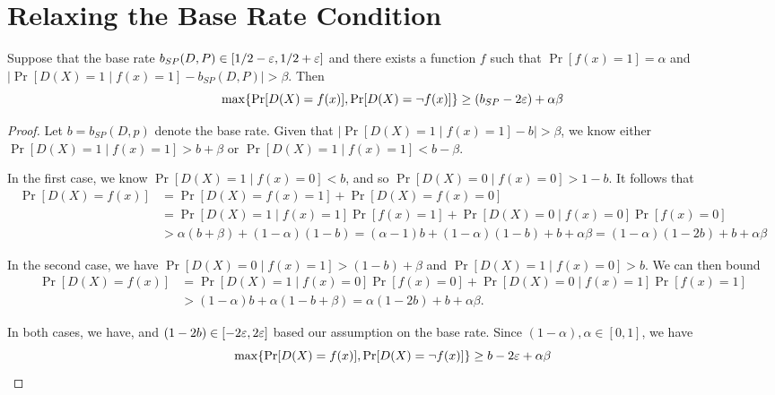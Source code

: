 \iffalse
\section{Relaxing the Base Rate Condition}

\begin{lemma}\label{dis-acc2}
  Suppose that the base rate
  $b_{SP}(D, P) \in [1/2 - \varepsilon, 1/2 + \varepsilon]$ and there exists a
  function $f$ such that $\Pr[f(x) = 1] = \alpha$ and
  $|\Pr[D(X) = 1 \mid f(x) = 1] - b_{SP}(D, P)| > \beta$.  Then
  $$
  \max\{\Pr[D(X) = f(x)], \Pr[D(X) = \neg f(x)]\} \geq
  (b_{SP} - 2\varepsilon)  + \alpha\beta
  $$
\end{lemma}



\begin{proof}
  Let $b = b_{SP}(D, p)$ denote the base rate. Given that
  $|\Pr[D(X) = 1 \mid f(x) = 1] - b| > \beta$, we know either
  $\Pr[D(X) = 1 \mid f(x) = 1] > b+ \beta$ or
  $\Pr[D(X) = 1\mid f(x) = 1] < b - \beta$.

  In the first case, we know $\Pr[D(X) = 1\mid f(x) = 0] < b$, and
  so $\Pr[D(X) = 0 \mid f(x) = 0] > 1 - b$. It follows that
  \begin{align*}
    \Pr[D(X) = f(x) ] &= \Pr[D(X) = f(x) = 1] +\Pr[D(X) =
      f(x) = 0]\\
    &= \Pr[D(X) = 1 \mid f(x) = 1]\Pr[f(x) = 1] + \Pr[D(X) = 0 \mid f(x) = 0] \Pr[f(x)=0]\\
    &> \alpha (b + \beta) + (1-\alpha) (1 - b) =
      (\alpha - 1) b + (1 - \alpha) (1 - b) + b + \alpha\beta = (1 - \alpha)(1 - 2b) + b + \alpha\beta
  \end{align*}

  In the second case, we have
  $\Pr[D(X) = 0 \mid f(x) = 1] > (1 - b) + \beta$ and
  $\Pr[D(X) = 1\mid f(x) = 0] > b$. We can then bound
  \begin{align*}
   \Pr[D(X) = f(x) ] &= \Pr[D(X) = 1 \mid f(x) = 0]\Pr[f(x) = 0] + \Pr[D(X) = 0 \mid f(x) = 1] \Pr[f(x)=1]\\
    &> (1- \alpha) b  + \alpha (1 - b + \beta) =  \alpha(1 - 2b) +
      b+ \alpha\beta.
  \end{align*}

  In both cases, we have, and $(1 - 2b) \in [-2\varepsilon, 2\varepsilon]$ based our
  assumption on the base rate. Since $(1 - \alpha), \alpha\in [0,1]$,
  we have
  $$
  \max\{\Pr[D(X) = f(x)], \Pr[D(X) = \neg f(x)]\} \geq b - 2\varepsilon +
  \alpha\beta
  $$
\end{proof}



